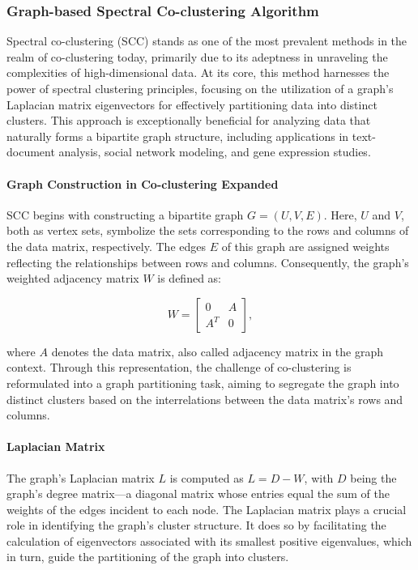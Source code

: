 \subsubsection{Graph-based Spectral Co-clustering Algorithm}

Spectral co-clustering (SCC) stands as one of the most prevalent methods in the realm of co-clustering today\cite{vonluxburg2007TutorialSpectralClustering}, primarily due to its adeptness in unraveling the complexities of high-dimensional data. At its core, this method harnesses the power of spectral clustering principles, focusing on the utilization of a graph's Laplacian matrix eigenvectors for effectively partitioning data into distinct clusters. This approach is exceptionally beneficial for analyzing data that naturally forms a bipartite graph structure, including applications in text-document analysis, social network modeling, and gene expression studies. 


\paragraph{Graph Construction in Co-clustering Expanded}

SCC begins with constructing a bipartite graph $G=(U,V,E)$. Here, $U$ and $V$, both as vertex sets, symbolize the sets corresponding to the rows and columns of the data matrix, respectively. The edges $E$ of this graph are assigned weights reflecting the relationships between rows and columns. Consequently, the graph's weighted adjacency matrix $W$ is defined as:

$$ W = \begin{bmatrix} 0 & A \\ A^T & 0 \end{bmatrix}, $$

where $A$ denotes the data matrix, also called adjacency matrix in the graph context. 
Through this representation, the challenge of co-clustering is reformulated into a graph partitioning task, aiming to segregate the graph into distinct clusters based on the interrelations between the data matrix's rows and columns.

\paragraph{Laplacian Matrix}

The graph's Laplacian matrix $L$ is computed as $L=D-W$, with $D$ being the graph's degree matrix—a diagonal matrix whose entries equal the sum of the weights of the edges incident to each node. The Laplacian matrix plays a crucial role in identifying the graph's cluster structure. It does so by facilitating the calculation of eigenvectors associated with its smallest positive eigenvalues, which in turn, guide the partitioning of the graph into clusters.

